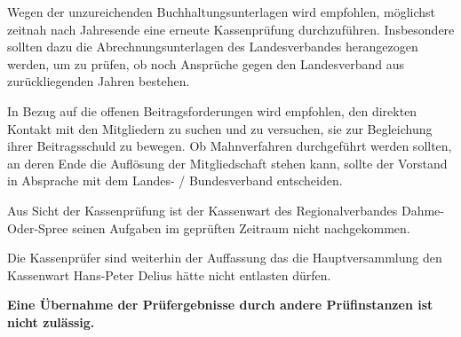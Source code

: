 \documentclass[%
	titlepage,oneside,12pt,headlines=1.5,numbers=noenddot, chapterprefix=false,parskip=full-,DIV=14,pagesize]{scrreprt}
\begin{document}
Wegen der unzureichenden Buchhaltungsunterlagen wird empfohlen, möglichst zeitnah nach Jahresende eine erneute Kassenprüfung durchzuführen. Insbesondere sollten dazu die Abrechnungsunterlagen des Landesverbandes herangezogen werden, um zu prüfen, ob noch Ansprüche gegen den Landesverband aus zurückliegenden Jahren bestehen.

In Bezug auf die offenen Beitragsforderungen wird empfohlen, den direkten Kontakt mit den Mitgliedern zu
suchen und zu versuchen, sie zur Begleichung ihrer Beitragsschuld zu bewegen. Ob Mahnverfahren durchgeführt werden sollten, an deren Ende die Auflösung der Mitgliedschaft stehen kann, sollte der Vorstand in Absprache mit dem Landes- / Bundesverband entscheiden.

Aus Sicht der Kassenprüfung ist der Kassenwart des Regionalverbandes Dahme-Oder-Spree seinen Aufgaben im geprüften Zeitraum nicht nachgekommen.

Die Kassenprüfer sind weiterhin der Auffassung das die Hauptversammlung den Kassenwart Hans-Peter Delius hätte nicht entlasten dürfen.

\textbf{Eine Übernahme der Prüfergebnisse durch andere Prüfinstanzen ist nicht zulässig.}
\end{document}
